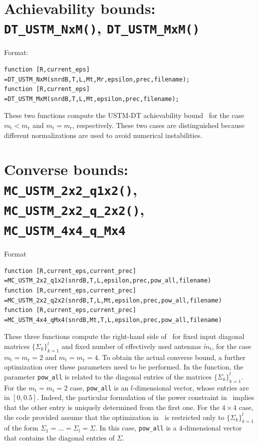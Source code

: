 \documentclass[a4paper,11p]{memoir}
\def\txant{m_{\mathrm{t}}} %
\def\txantalt{\widetilde{m}_{\mathrm{t}}}
\def\rxant{m_{\mathrm{r}}} %
\def\tfdiv{l}  %
\begin{document}
\section{Achievability bounds: \texttt{DT\_USTM\_NxM()}, \texttt{DT\_USTM\_MxM()}} %
\label{sec:achievability_bound_dt_ustm_nxm}
%
Format:
\begin{verbatim}
function [R,current_eps]
=DT_USTM_NxM(snrdB,T,L,Mt,Mr,epsilon,prec,filename);
function [R,current_eps]
=DT_USTM_MxM(snrdB,T,L,Mt,epsilon,prec,filename);
\end{verbatim}

These two functions compute the USTM-DT achievability bound~\cite[Th.~3]{durisi14-12a} for the case $\txant< \rxant$ and $\txant=\rxant$, respectively. These two cases are distinguished because different normalizations are used to avoid numerical instabilities.

\section{Converse bounds: \texttt{MC\_USTM\_2x2\_q1x2()}, \texttt{MC\_USTM\_2x2\_q\_2x2()}, \texttt{MC\_USTM\_4x4\_q\_Mx4}} %
\label{sec:converse_bounds__texttt}

Format

\begin{verbatim}
function [R,current_eps,current_prec]
=MC_USTM_2x2_q1x2(snrdB,T,L,epsilon,prec,pow_all,filename)
function [R,current_eps,current_prec]
=MC_USTM_2x2_q2x2(snrdB,T,L,Mt,epsilon,prec,pow_all,filename)
function [R,current_eps,current_prec]
=MC_USTM_4x4_qMx4(snrdB,Mt,T,L,epsilon,prec,pow_all,filename)
\end{verbatim}

These three functions compute the right-hand side of~\cite[Eq.~(41)]{durisi14-12a} for fixed input diagonal matrices $\{\Sigma_k\}_{k=1}^{\tfdiv}$ and fixed number of effectively used antennas $\txantalt$, for the case $\txant=\rxant=2$ and $\txant=\rxant=4$. 
To obtain the actual converse bound, a further optimization over these parameters need to be performed. In the function, the parameter \verb|pow_all| is related to the diagonal entries of the matrices $\{\Sigma_k\}_{k=1}^{\tfdiv}$. For the $\txant=\rxant=2$ case, \verb|pow_all| is an $\tfdiv$-dimensional vector, whose entries are in $[0,0.5]$. Indeed, the particular formulation of the power constraint in~\cite[Eq.~(41)]{durisi14-12a} implies that the other entry is uniquely determined from the first one.
For the $4\times 4$ case, the code provided assume that the optimization in~\cite[Eq.~(41)]{durisi14-12a} is restricted only to $\{\Sigma_k\}_{k=1}^{\tfdiv}$ of the form $\Sigma_1=\dots=\Sigma_\tfdiv=\Sigma$. In this case, \verb|pow_all| is a $4$-dimensional vector that contains the diagonal entries of $\Sigma$.
\end{document}
